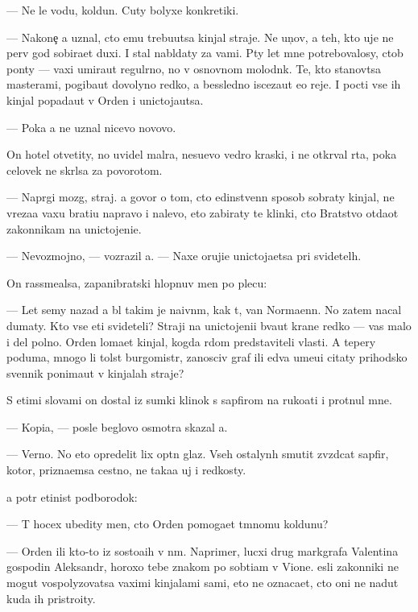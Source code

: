\documentclass[10pt]{book}
\begin{document}
— Ne le{\y} vodu, koldun. Cuty bolyxe konkretiki.

— Nakone{\c} {\y}a uznal, cto {\y}emu trebu{\y}utsa kinjal{\yi} straje{\y}. Ne {\y}un{\c}ov, a teh, kto uje ne perv{\yi}{\y} god sobira{\y}et duxi. I stal nabl{\iu}daty za vami. P{\ia}ty let mne potrebovalosy, ctob{\yi} pon{\ia}ty — vaxi umira{\y}ut regul{\ia}rno, no v osnovnom molodn{\ia}k. Te, kto stanov{\ia}tsa masterami, pogiba{\y}ut dovolyno redko, a bessledno isceza{\y}ut {\y}e{\x}o reje. I pocti vse ih kinjal{\yi} popada{\y}ut v Orden i unictoja{\y}utsa.

— Poka {\y}a ne uznal nicevo novovo.

On hotel otvetity, no uvidel mal{\ia}ra, nesu{\x}evo vedro kraski, i ne otkr{\yi}val rta, poka celovek ne skr{\yi}lsa za povorotom.

— Napr{\ia}gi mozg, straj. {\Y}a govor{\iu} o tom, cto {\y}edinstvenn{\yi}{\y} sposob sobraty kinjal{\yi}, ne v{\yi}reza{\y}a vaxu brati{\y}u napravo i nalevo, eto zabiraty te klinki, cto Bratstvo otda{\y}ot zakonnikam na unictojeni{\y}e.

— Nevozmojno, — vozrazil {\y}a. — Naxe oruji{\y}e unictoja{\y}etsa pri svidetel{\ia}h.

On rassme{\y}alsa, zapanibratski hlopnuv men{\ia} po plecu:

— Let semy nazad {\y}a b{\yi}l takim je naivn{\yi}m, kak t{\yi}, van Normaenn. No zatem nacal dumaty. Kto vse eti svideteli? Straji na unictojeni{\y}i b{\yi}va{\y}ut kra{\y}ne redko — vas malo i del polno. Orden loma{\y}et kinjal, kogda r{\ia}dom predstaviteli vlasti. A tepery poduma{\y}, mnogo li tolst{\yi}{\y} burgomistr, zanosciv{\yi}{\y} graf ili {\y}edva ume{\y}u{\x}i{\y} citaty prihodsko{\y} sv{\ia}{\x}ennik ponima{\y}ut v kinjalah straje{\y}?

S etimi slovami on dostal iz sumki klinok s sapfirom na ruko{\y}ati i prot{\ia}nul mne.

— Kopi{\y}a, — posle beglovo osmotra skazal {\y}a.

— Verno. No eto opredelit lix op{\yi}tn{\yi}{\y} glaz. Vseh ostalyn{\yi}h smutit zv{\e}zdcat{\yi}{\y} sapfir, kotor{\yi}{\y}, prizna{\y}emsa cestno, ne taka{\y}a uj i redkosty.

{\Y}a pot{\e}r {\x}etinist{\yi}{\y} podborodok:

— T{\yi} hocex ubedity men{\ia}, cto Orden pomoga{\y}et t{\e}mnomu koldunu?

— Orden ili kto-to iz sosto{\y}a{\x}ih v n{\e}m. Naprimer, lucxi{\y} drug markgrafa Valentina gospodin Aleksandr, horoxo tebe znakom{\yi}{\y} po sob{\yi}ti{\y}am v Vione. {\Y}esli zakonniki ne mogut vospolyzovatsa vaximi kinjalami sami, eto ne oznaca{\y}et, cto oni ne na{\y}dut kuda ih pristro{\y}ity.
\end{document}
